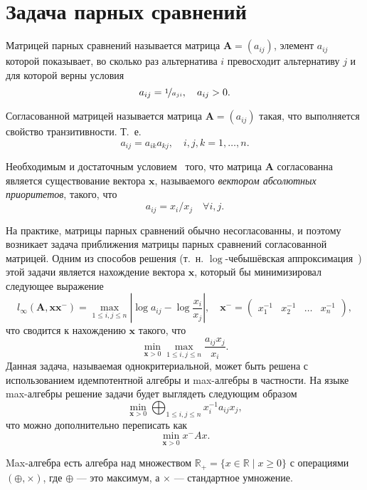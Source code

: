 \documentclass[specialist,
	substylefile = spbu_report.rtx,
	subf,href,colorlinks=true, 12pt]{disser}
\begin{document}
\chapter{Задача парных сравнений}
\begin{definition}{Матрицей парных сравнений}
	называется матрица $\boldsymbol{A} = (a_{ij})$, элемент $a_{ij}$ которой показывает, во сколько раз альтернатива $i$ превосходит альтернативу $j$ и для которой верны условия
	\[
		a_{ij} = \nicefrac{1}{a_{ji}}, \quad a_{ij} > 0.
	\]
\end{definition}
\begin{definition}{Согласованной матрицей}
	называется матрица $\boldsymbol{A} = (a_{ij})$ такая, что выполняется свойство транзитивности. Т.~е.
	\[
		a_{ij} = a_{ik}a_{kj}, \quad i,j,k = 1,\dots,n.
	\]
\end{definition}
\begin{utv}
	Необходимым и достаточным условием~\cite{saaty1984} того, что матрица $\boldsymbol{A}$
	согласованна является существование вектора $\boldsymbol{x}$, называемого \textit{вектором абсолютных приоритетов}, такого, что
	\[
		a_{ij} = x_{i}/x_{j} \quad \forall i, j.
	\]
\end{utv}
На практике, матрицы парных сравнений обычно несогласованны, и поэтому возникает задача приближения матрицы парных сравнений согласованной матрицей.
Одним из способов решения (т.~н. $\log$-чебышёвская аппроксимация~\cite{krivulin2019}) этой задачи является нахождение вектора $\boldsymbol{x}$, который бы минимизировал следующее выражение
\[
	l_{\infty}\left(\boldsymbol{A}, \boldsymbol{x} \boldsymbol{x}^{-}\right)=\max _{1 \leq i, j \leq n}\left|\log a_{i j}-\log \frac{x_{i}}{x_{j}}\right|, \quad \boldsymbol{x}^{-} = \begin{pmatrix}x_1^{-1}&x_2^{-1} & \dots & x_n^{-1}\end{pmatrix},
\]
что сводится к нахождению $\boldsymbol{x}$ такого, что
\[
	\min _{\boldsymbol{x}>0} \max _{1 \leq i, j \leq n} \frac{a_{i j} x_{j}}{x_{i}}.
\]
Данная задача, называемая однокритериальной, может быть решена с использованием идемпотентной алгебры и max-алгебры в частности.
На языке max-алгебры решение задачи будет выглядеть следующим образом
\[
	\min _{\boldsymbol{x}>0} \bigoplus_{1 \leq i, j \leq n} x_{i}^{-1} a_{i j} x_{j},
\]
что можно дополнительно переписать как
\[
	\min _{\boldsymbol{x}>0} x^{-} A x.
\]

\begin{definition}{Max-алгебра}
	есть алгебра над множеством $\mathbb{R}_{+}=\{x \in \mathbb{R} \mid x \geq 0\}$ с операциями ${(\oplus, \times)}$, где $\oplus$ --- это максимум, а $\times$ --- стандартное умножение.
\end{definition}
\end{document}
